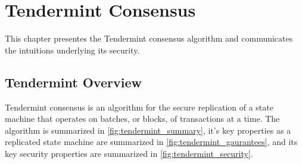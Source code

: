 \chapter{Tendermint Consensus}
\label{ch:tendermint}

This chapter presentes the Tendermint consensus algorithm and communicates the intuitions underlying its security.

\section{Tendermint Overview}

Tendermint consensus is an algorithm for the secure replication of a state machine that operates on batches, or blocks, of transactions at a time.
The algorithm is summarized in \ref{fig:tendermint_summary}, it's key properties as a replicated state machine are summarized in \ref{fig:tendermint_gaurantees}, and its key security properties are summarized in \ref{fig:tendermint_security}.

